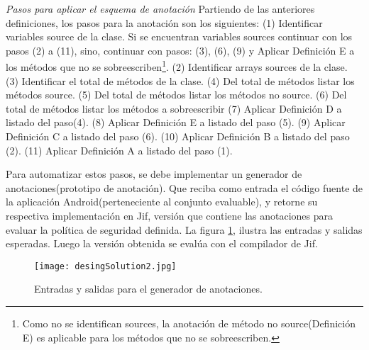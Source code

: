 \textit{Pasos para aplicar el esquema de anotación}\newline
Partiendo de las anteriores definiciones, los pasos para la anotación son los
siguientes:\newline
(1) Identificar variables source de la clase. Si se encuentran variables sources
continuar con los pasos (2) a (11), sino, continuar con pasos: (3), (6), (9) y
Aplicar Definición E a los métodos que no se sobreescriben\footnote{Como no se
identifican sources, la anotación de método no source(Definición E) es
aplicable para los métodos que no se sobreescriben.}.
(2) Identificar arrays sources de la clase.
(3) Identificar el total de métodos de la clase.\newline
(4) Del total de métodos listar los métodos source.\newline
(5) Del total de métodos listar los métodos no source.\newline
(6) Del total de métodos listar los métodos a sobreescribir\newline
(7) Aplicar Definición D a listado del paso(4).\newline
(8) Aplicar Definición E a listado del paso (5).\newline
(9) Aplicar Definición C a listado del paso (6).\newline
(10) Aplicar Definición B a listado del paso (2).\newline
(11) Aplicar Definición A a listado del paso (1).

Para automatizar estos pasos, se debe implementar un generador de
anotaciones(prototipo de anotación). Que reciba como entrada el código fuente de
la aplicación Android(perteneciente al conjunto evaluable), y retorne su
respectiva implementación en Jif, versión que contiene las anotaciones para
evaluar la política de seguridad definida.\newline
La figura \ref{fig:desingSolution}, ilustra las entradas y salidas
esperadas.\newline
Luego la versión obtenida se evalúa con el compilador de Jif.
\label{subsec:anotador}
\label{subsec:pasosSol}
\begin{figure}[t!]
	\begin{center}
	\texttt{[image: desingSolution2.jpg]}
	\end{center}
	\caption{Entradas y salidas para el generador de anotaciones.}
	\label{fig:desingSolution} 
\end{figure}

